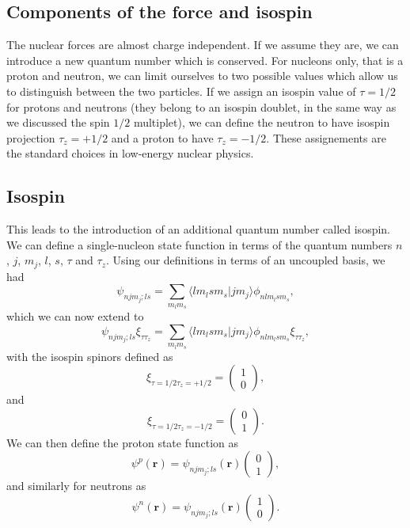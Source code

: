 \documentclass[%
twoside,                 %
final,                   %
10pt]{article}
\begin{document}
\subsection{Components of the force and isospin}
\begin{block}{}
 The nuclear forces are almost charge independent. If we assume they are, 
we can introduce a new quantum number which is conserved. For nucleons only, that is a proton and neutron, we can limit ourselves
to two possible values which allow us to distinguish between the two particles. If we assign an isospin value of $\tau=1/2$ for protons
and neutrons (they belong to an isospin doublet, in the same way as we discussed the spin $1/2$ multiplet), we can define 
the neutron to have isospin projection $\tau_z=+1/2$ and a proton to have $\tau_z=-1/2$. These assignements are the standard choices in low-energy nuclear physics.
\end{block}

\subsection{Isospin}
\begin{block}{}
This leads to the introduction of an additional quantum number called isospin.
We can define a single-nucleon
state function in terms of the quantum numbers $n$, $j$, $m_j$, $l$, $s$, $\tau$ and $\tau_z$. Using our definitions in terms of an uncoupled basis, we had 
\[
\psi_{njm_j;ls}=\sum_{m_lm_s}\langle lm_lsm_s|jm_j\rangle\phi_{nlm_lsm_s},
\]
which we can now extend to
\[
\psi_{njm_j;ls}\xi_{\tau\tau_z}=\sum_{m_lm_s}\langle lm_lsm_s|jm_j\rangle\phi_{nlm_lsm_s}\xi_{\tau\tau_z},
\]
with the isospin spinors defined as 
\[
\xi_{\tau=1/2\tau_z=+1/2}=\left(\begin{array}{c} 1  \\ 0\end{array}\right),
\]
and
\[
\xi_{\tau=1/2\tau_z=-1/2}=\left(\begin{array}{c} 0  \\ 1\end{array}\right).
\]
We can then define the proton state function as 
\[
\psi^p(\mathbf{r})  =\psi_{njm_j;ls}(\mathbf{r})\left(\begin{array}{c} 0  \\ 1\end{array}\right), 
\]
and similarly for neutrons as
\[
\psi^n(\mathbf{r})  =\psi_{njm_j;ls}(\mathbf{r})\left(\begin{array}{c} 1  \\ 0\end{array}\right). 
\]
\end{block}
\end{document}
